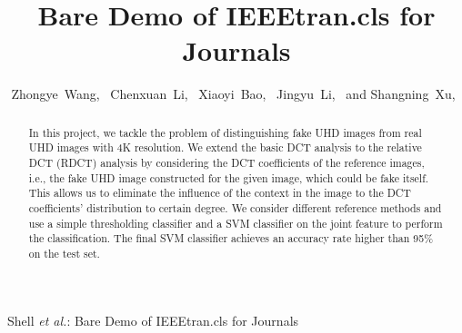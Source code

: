 \documentclass[journal,conference]{IEEEtran}
\begin{document}
%
\title{Bare Demo of IEEEtran.cls for Journals}
%
%
%

\author{
	Zhongye~Wang,~
	Chenxuan~Li,~
	Xiaoyi~Bao,~
	Jingyu~Li,~
	and Shangning~Xu,~
}

%
{Shell \MakeLowercase{\textit{et al.}}: Bare Demo of IEEEtran.cls for Journals}
%


\maketitle

\begin{abstract}
In this project, we tackle the problem of distinguishing fake UHD images from real UHD images with 4K resolution.
We extend the basic DCT analysis to the relative DCT (RDCT) analysis by considering the DCT coefficients of the reference images, i.e., the fake UHD image constructed for the given image, which could be fake itself.
This allows us to eliminate the influence of the context in the image to the DCT coefficients' distribution to certain degree.
We consider different reference methods and use a simple thresholding classifier and a SVM classifier on the joint feature to perform the classification.
The final SVM classifier achieves an accuracy rate higher than 95\% on the test set.
\end{abstract}
\end{document}
